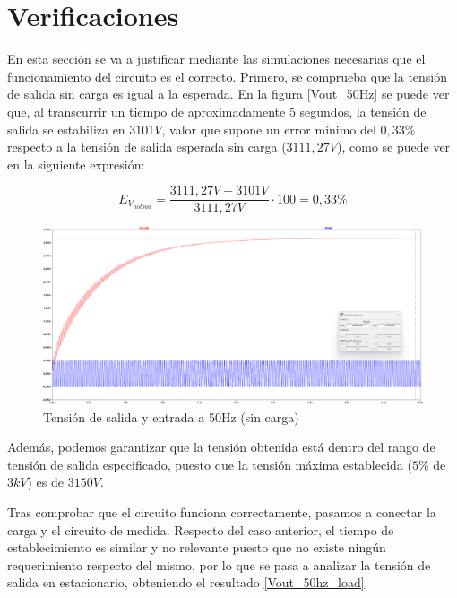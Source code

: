 \section{Verificaciones}

En esta sección se va a justificar mediante las simulaciones necesarias que el funcionamiento del circuito es el correcto.
Primero, se comprueba que la tensión de salida sin carga es igual a la esperada. En la figura \ref{Vout_50Hz} se puede ver que, al transcurrir
un tiempo de aproximadamente 5 segundos, la tensión de salida se estabiliza en $3101V$, valor que supone un error mínimo del $0,33\%$
respecto a la tensión de salida esperada sin carga ($3111,27V$), como se puede ver en la siguiente expresión:

\begin{equation}
    E_{V_{noload}} = \frac{3111,27V - 3101V}{3111,27V} \cdot 100 = 0,33\%
\end{equation}

\begin{figure}[H]
    \centering
    \includegraphics[width=1\textwidth]{Imagenes_alvaro/Vout_50hz.png}
    \caption{Tensión de salida y entrada a 50Hz (sin carga)}
    \label{Vout_50hz}
\end{figure}

Además, podemos garantizar que la tensión obtenida está dentro del rango de tensión de salida especificado, puesto que la tensión máxima 
establecida ($5\%$ de $3kV$) es de $3150V$.

Tras comprobar que el circuito funciona correctamente, pasamos a conectar la carga y el circuito de medida.
Respecto del caso anterior, el tiempo de establecimiento es similar y no relevante puesto que no existe ningún requerimiento respecto del mismo, por lo que
se pasa a analizar la tensión de salida en estacionario, obteniendo el resultado \ref{Vout_50hz_load}.

